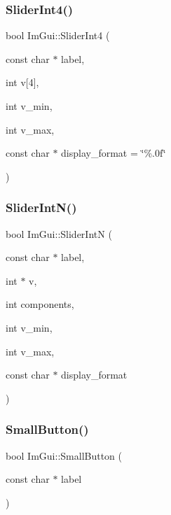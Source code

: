 \hypertarget{namespace_im_gui_a88c24aa0e5af4cbb14559b5789886810}{}\label{namespace_im_gui_a88c24aa0e5af4cbb14559b5789886810} 
\subsubsection{\texorpdfstring{Slider\+Int4()}{SliderInt4()}}
{\footnotesize\ttfamily bool Im\+Gui\+::\+Slider\+Int4 (\begin{DoxyParamCaption}\item[{const char $\ast$}]{label,  }\item[{int}]{v\mbox{[}4\mbox{]},  }\item[{int}]{v\+\_\+min,  }\item[{int}]{v\+\_\+max,  }\item[{const char $\ast$}]{display\+\_\+format = {\ttfamily \char`\"{}\%.0f\char`\"{}} }\end{DoxyParamCaption})}

\hypertarget{namespace_im_gui_a13fe35db80c7d1002c98fd5e8ea90239}{}\label{namespace_im_gui_a13fe35db80c7d1002c98fd5e8ea90239} 
\subsubsection{\texorpdfstring{Slider\+Int\+N()}{SliderIntN()}}
{\footnotesize\ttfamily bool Im\+Gui\+::\+Slider\+IntN (\begin{DoxyParamCaption}\item[{const char $\ast$}]{label,  }\item[{int $\ast$}]{v,  }\item[{int}]{components,  }\item[{int}]{v\+\_\+min,  }\item[{int}]{v\+\_\+max,  }\item[{const char $\ast$}]{display\+\_\+format }\end{DoxyParamCaption})}

\hypertarget{namespace_im_gui_a5b76ec69758aeb0a00a66f142f7a4fb2}{}\label{namespace_im_gui_a5b76ec69758aeb0a00a66f142f7a4fb2} 
\subsubsection{\texorpdfstring{Small\+Button()}{SmallButton()}}
{\footnotesize\ttfamily bool Im\+Gui\+::\+Small\+Button (\begin{DoxyParamCaption}\item[{const char $\ast$}]{label }\end{DoxyParamCaption})}

